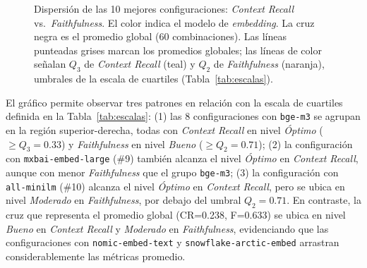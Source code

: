 \documentclass{article}
\begin{document}
\begin{figure}[H]
\caption{Dispersión de las 10 mejores configuraciones: \textit{Context Recall} vs.\ \textit{Faithfulness}.
  El color indica el modelo de \textit{embedding}. La cruz negra es el promedio global (60 combinaciones).
  Las líneas punteadas grises marcan los promedios globales; las líneas de color señalan
  $Q_3$ de \textit{Context Recall} (teal) y $Q_2$ de \textit{Faithfulness} (naranja),
  umbrales de la escala de cuartiles (Tabla~\ref{tab:escalas}).}
\label{fig:scatter}
\end{figure}

El gráfico permite observar tres patrones en relación con la escala de cuartiles definida en la Tabla~\ref{tab:escalas}: (1) las 8 configuraciones con \texttt{bge-m3} se agrupan en la región superior-derecha, todas con \textit{Context Recall} en nivel \textit{Óptimo} ($\geq Q_3 = 0.33$) y \textit{Faithfulness} en nivel \textit{Bueno} ($\geq Q_2 = 0.71$); (2) la configuración con \texttt{mxbai-embed-large} (\#9) también alcanza el nivel \textit{Óptimo} en \textit{Context Recall}, aunque con menor \textit{Faithfulness} que el grupo \texttt{bge-m3}; (3) la configuración con \texttt{all-minilm} (\#10) alcanza el nivel \textit{Óptimo} en \textit{Context Recall}, pero se ubica en nivel \textit{Moderado} en \textit{Faithfulness}, por debajo del umbral $Q_2 = 0.71$. En contraste, la cruz que representa el promedio global (CR=0.238, F=0.633) se ubica en nivel \textit{Bueno} en \textit{Context Recall} y \textit{Moderado} en \textit{Faithfulness}, evidenciando que las configuraciones con \texttt{nomic-embed-text} y \texttt{snowflake-arctic-embed} arrastran considerablemente las métricas promedio.
\end{document}
